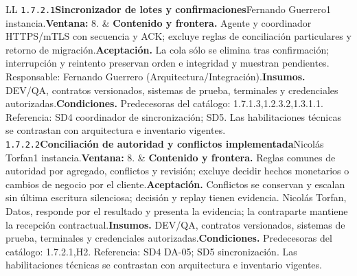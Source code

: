 \begin{longtable}{L{\tabcolsep\relax}L{\tabcolsep\relax}}
\texttt{1.\allowbreak{}7.\allowbreak{}2.\allowbreak{}1}\newline{}\textbf{Sincronizador de lotes y confirmaciones}\newline{}Fernando Guerrero\newline{}1 instancia.\newline{}\textbf{Ventana:} 8. & \textbf{Contenido y frontera.} Agente y coordinador HTTPS/mTLS con secuencia y ACK; excluye reglas de conciliación particulares y retorno de migración.\newline{}\textbf{Aceptación.} La cola sólo se elimina tras confirmación; interrupción y reintento preservan orden e integridad y muestran pendientes. Responsable: Fernando Guerrero (Arquitectura/Integración).\newline{}\textbf{Insumos.} DEV/QA, contratos versionados, sistemas de prueba, terminales y credenciales autorizadas.\newline{}\textbf{Condiciones.} Predecesoras del catálogo: 1.7.1.3,1.2.3.2,1.3.1.1. Referencia: SD4 coordinador de sincronización; SD5. Las habilitaciones técnicas se contrastan con arquitectura e inventario vigentes.\\\hline
\texttt{1.\allowbreak{}7.\allowbreak{}2.\allowbreak{}2}\newline{}\textbf{Conciliación de autoridad y conflictos implementada}\newline{}Nicolás Torfan\newline{}1 instancia.\newline{}\textbf{Ventana:} 8. & \textbf{Contenido y frontera.} Reglas comunes de autoridad por agregado, conflictos y revisión; excluye decidir hechos monetarios o cambios de negocio por el cliente.\newline{}\textbf{Aceptación.} Conflictos se conservan y escalan sin última escritura silenciosa; decisión y replay tienen evidencia. Nicolás Torfan, Datos, responde por el resultado y presenta la evidencia; la contraparte mantiene la recepción contractual.\newline{}\textbf{Insumos.} DEV/QA, contratos versionados, sistemas de prueba, terminales y credenciales autorizadas.\newline{}\textbf{Condiciones.} Predecesoras del catálogo: 1.7.2.1,H2. Referencia: SD4 DA-05; SD5 sincronización. Las habilitaciones técnicas se contrastan con arquitectura e inventario vigentes.\\\hline

\end{longtable}
